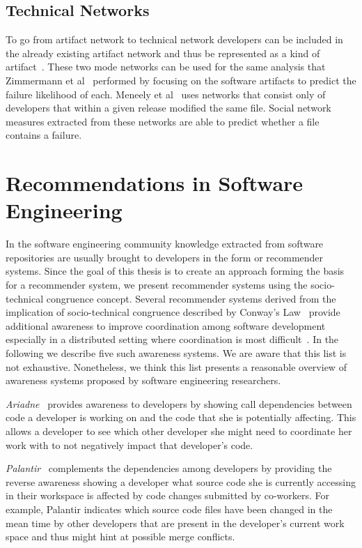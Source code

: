 \subsection{Technical Networks}
\label{chap:6:tn}
To go from artifact network to technical network developers can be included in the already existing artifact network and thus be represented as a kind of artifact~\cite{pinzger:fse:2008}.
These two mode networks can be used for the same analysis that Zimmermann et al~\cite{zimmermann:esem:2009,zimmermann:icse:2008} performed by focusing on the software artifacts to predict the failure likelihood of each.
%
Meneely et al~\cite{meneely:fse:2008} uses networks that consist only of developers that within a given release modified the same file.
Social network measures extracted from these networks are able to predict whether a file contains a failure.




\section{Recommendations in Software Engineering}
In the software engineering community knowledge extracted from software repositories are usually brought to developers in the form or recommender systems.
Since the goal of this thesis is to create an approach forming the basis for a recommender system, we present recommender systems using the socio-technical congruence concept.
Several recommender systems derived from the implication of socio-technical congruence described by Conway's Law~\cite{conway:datamination:1968} provide additional awareness to improve coordination among software development especially in a distributed setting where coordination is most difficult~\cite{olson:hci:2000}.
In the following we describe five such awareness systems.
We are aware that this list is not exhaustive. 
Nonetheless, we think this list presents a reasonable overview of awareness systems proposed by software engineering researchers.

\emph{Ariadne}~\cite{trainer2005:ariadne} provides awareness to developers by showing call dependencies between code a developer is working on and the code that she is potentially affecting.
This allows a developer to see which other developer she might need to coordinate her work with to not negatively impact that developer's code.

\emph{Palantir}~\cite{sarma:cscw:2002} complements the dependencies among developers by providing the reverse awareness  showing a developer what source code she is currently accessing in their workspace is affected by code changes submitted by co-workers.
For example, Palantir indicates which source code files have been changed in the mean time by other developers that are present in the developer's current work space and thus might hint at possible merge conflicts.

